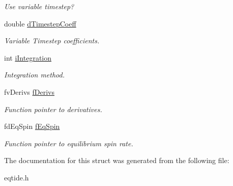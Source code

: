 \begin{DoxyCompactItemize}
\begin{DoxyCompactList}\small\item\em Use variable timestep? \end{DoxyCompactList}\item 
\hypertarget{struct_p_a_r_a_m_af340cc777bae1c46c80b0e8fbc08db4a}{}double \hyperlink{struct_p_a_r_a_m_af340cc777bae1c46c80b0e8fbc08db4a}{d\+Timestep\+Coeff}\label{struct_p_a_r_a_m_af340cc777bae1c46c80b0e8fbc08db4a}

\begin{DoxyCompactList}\small\item\em Variable Timestep coefficients. \end{DoxyCompactList}\item 
\hypertarget{struct_p_a_r_a_m_a9bac932f00ef199c019009908fb1b1db}{}int \hyperlink{struct_p_a_r_a_m_a9bac932f00ef199c019009908fb1b1db}{i\+Integration}\label{struct_p_a_r_a_m_a9bac932f00ef199c019009908fb1b1db}

\begin{DoxyCompactList}\small\item\em Integration method. \end{DoxyCompactList}\item 
\hypertarget{struct_p_a_r_a_m_ad1b6d31a18b5730f94198111cedf1904}{}fv\+Derivs \hyperlink{struct_p_a_r_a_m_ad1b6d31a18b5730f94198111cedf1904}{f\+Derivs}\label{struct_p_a_r_a_m_ad1b6d31a18b5730f94198111cedf1904}

\begin{DoxyCompactList}\small\item\em Function pointer to derivatives. \end{DoxyCompactList}\item 
\hypertarget{struct_p_a_r_a_m_acae94ee8ce73820cae4d5405bc9e6ee1}{}fd\+Eq\+Spin \hyperlink{struct_p_a_r_a_m_acae94ee8ce73820cae4d5405bc9e6ee1}{f\+Eq\+Spin}\label{struct_p_a_r_a_m_acae94ee8ce73820cae4d5405bc9e6ee1}

\begin{DoxyCompactList}\small\item\em Function pointer to equilibrium spin rate. \end{DoxyCompactList}\end{DoxyCompactItemize}


The documentation for this struct was generated from the following file\+:\begin{DoxyCompactItemize}
\item 
eqtide.\+h\end{DoxyCompactItemize}
